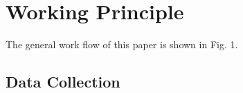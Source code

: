 \documentclass[conference]{IEEEtran}
\begin{document}
%





\section{Working Principle}

The general work flow of this paper is shown in Fig. 1.

\subsection{Data Collection}
\end{document}
